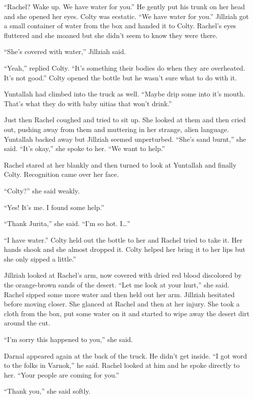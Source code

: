 ``Rachel? Wake up. We have water for you.'' He gently put his trunk on her head and she opened
her eyes. Colty was ecstatic. ``We have water for you.'' Jillziah got a small container of water
from the box and handed it to Colty. Rachel's eyes fluttered and she moaned but she didn't seem
to know they were there.

``She's covered with water,'' Jillziah said.

``Yeah,'' replied Colty. ``It's something their bodies do when they are overheated. It's not
good.'' Colty opened the bottle but he wasn't sure what to do with it.

Yuntallah had climbed into the truck as well. ``Maybe drip some into it's mouth. That's what
they do with baby uitias that won't drink.''

Just then Rachel coughed and tried to sit up. She looked at them and then cried out, pushing
away from them and muttering in her strange, alien language. Yuntallah backed away but Jillziah
seemed unperturbed. ``She's sand burnt,'' she said. ``It's okay,'' she spoke to her. ``We want
to help.''

Rachel stared at her blankly and then turned to look at Yuntallah and finally Colty. Recognition
came over her face.

``Colty?'' she said weakly.

``Yes! It's me. I found some help.''

``Thank Jurita,'' she said. ``I'm so hot. I\ldots''

``I have water.'' Colty held out the bottle to her and Rachel tried to take it. Her hands shook
and she almost dropped it. Colty helped her bring it to her lips but she only sipped a little.''

Jillziah looked at Rachel's arm, now covered with dried red blood discolored by the orange-brown
sands of the desert. ``Let me look at your hurt,'' she said. Rachel sipped some more water and
then held out her arm. Jillziah hesitated before moving closer. She glanced at Rachel and then
at her injury. She took a cloth from the box, put some water on it and started to wipe away the
desert dirt around the cut.

``I'm sorry this happened to you,'' she said.

Darnal appeared again at the back of the truck. He didn't get inside. ``I got word to the folks
in Varnok,'' he said. Rachel looked at him and he spoke directly to her. ``Your people are
coming for you.''

``Thank you,'' she said softly.

